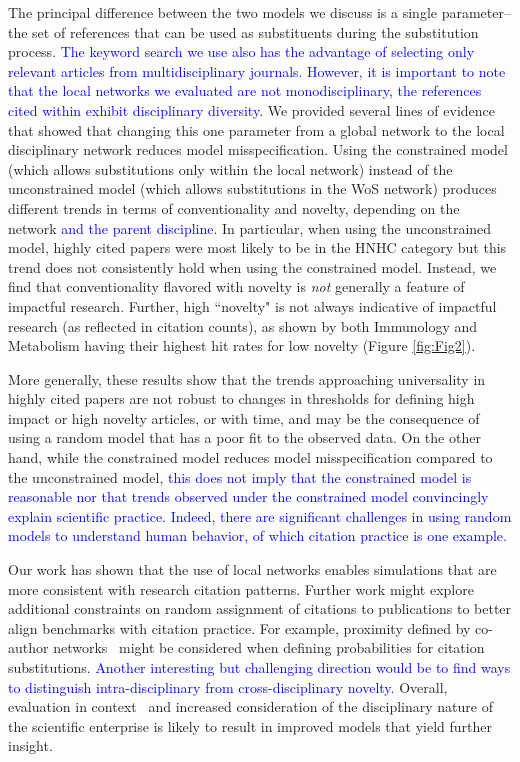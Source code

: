 \documentclass[NETN]{stjour}
\begin{document}
{The principal difference between the two models we discuss is a single parameter--the set of references that can be used as substituents during the substitution process. \textcolor{blue}{The keyword search we use also has the advantage of selecting only relevant articles from multidisciplinary journals. However, it is important to note that the local networks we evaluated are not monodisciplinary, the references cited within exhibit disciplinary diversity}. We provided several lines of evidence that showed that changing this one parameter from a global network to the local disciplinary network reduces model misspecification.  } Using the constrained model (which allows substitutions only within the local network)  instead of the unconstrained model (which allows substitutions in the WoS network) produces different trends in terms of conventionality and novelty, depending on the network \textcolor{blue}{and the parent discipline.} In particular, when using the unconstrained model, highly cited papers were most likely to be in the HNHC category but this trend does not consistently hold when using the constrained model. Instead, we find that conventionality flavored with novelty is {\em not} generally a feature of impactful research. Further,  high ``novelty" is not always indicative of impactful research (as reflected in citation counts), as shown by both Immunology and Metabolism having their highest hit rates for low novelty (Figure \ref{fig:Fig2}). 

More generally, these results show that the trends approaching universality in highly cited papers are not robust to changes in thresholds for defining high impact or high novelty articles, or with time, and may be the consequence of using a random model that has a poor fit to the observed data. On the other hand, while  the constrained model reduces model misspecification compared to the unconstrained model, \textcolor{blue}{this does not imply that the constrained model is reasonable nor that trends observed under the constrained model convincingly explain scientific practice. Indeed, there are significant  challenges in using random models to understand human behavior, of which citation practice is one example.}

Our work has shown that the use of local networks enables simulations that are more consistent with research citation patterns. Further work might explore additional constraints on random assignment of citations to publications to better align benchmarks with citation practice. For example, proximity defined by co-author networks~\citep{wallace_lariviere_gingras_2012} might be considered when defining probabilities for citation substitutions. \textcolor{blue}{Another interesting but challenging direction would be to find ways to distinguish intra-disciplinary from cross-disciplinary novelty.} Overall, evaluation in context~\citep{hicks_bibliometrics:_2015} and increased consideration of the disciplinary nature of the scientific enterprise is likely to result in improved models that yield further insight.
\end{document}

